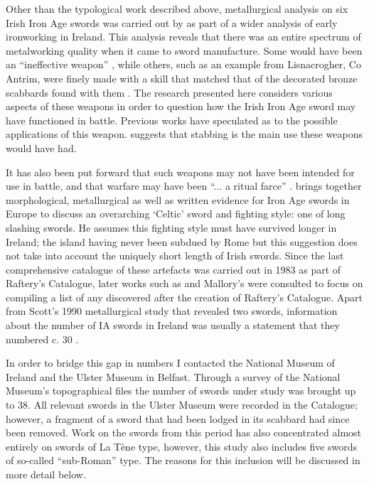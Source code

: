 Other than the typological work described above, metallurgical analysis on six Irish Iron Age swords was carried out by \textcite{Scott1990} as part of a wider analysis of early ironworking in Ireland. 
This analysis reveals that there was an entire spectrum of metalworking quality when it came to sword manufacture. 
Some would have been an “ineffective weapon” \parencite[125]{Scott1990}, while others, such as an example from Lisnacrogher, Co Antrim, were finely made with a skill that matched that of the decorated bronze scabbards found with them \parencite[65]{Scott1990}.
The research presented here considers various aspects of these weapons in order to question how the Irish Iron Age sword may have functioned in battle. 
Previous works have speculated as to the possible applications of this weapon. 
\textcite[121]{Raftery1989} suggests that stabbing is the main use these weapons would have had. 

It has also been put forward that such weapons may not have been intended for use in battle, and that warfare may have been “... a ritual farce” \parencite[304]{Waddell2000}. 
\textcite{Pleiner1993} brings together morphological, metallurgical as well as written evidence for Iron Age swords in Europe to discuss an overarching ‘Celtic’ sword and fighting style: 
one of long slashing swords. He assumes this fighting style must have survived longer in Ireland; 
the island having never been subdued by Rome \parencite[165]{Pleiner1993} but this suggestion does not take into account the uniquely short length of Irish swords.
Since the last comprehensive catalogue of these artefacts was carried out in 1983 as part of Raftery’s Catalogue, 
later works such as   and Mallory’s  were consulted to focus on compiling a list of any discovered after the creation of Raftery’s Catalogue. 
Apart from Scott’s 1990 metallurgical study that revealed two swords, information about the number of IA swords in Ireland was usually a statement that they numbered c. \num{30} 
\parencite[e.g.][180]{Mallory2013}. 

In order to bridge this gap in numbers I contacted the National Museum of Ireland and the Ulster Museum in Belfast. 
Through a survey of the National Museum’s topographical files the number of swords under study was brought up to 38. 
All relevant swords in the Ulster Museum were recorded in the Catalogue; 
however, a fragment of a sword that had been lodged in its scabbard had since been removed. 
Work on the swords from this period has also concentrated almost entirely on swords of La Tène type, however, this study also includes five swords of so-called “sub-Roman” type. 
The reasons for this inclusion will be discussed in more detail below.


